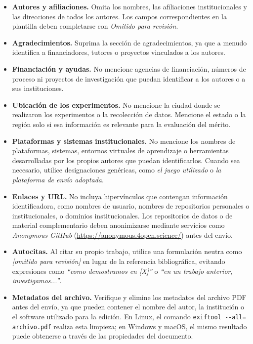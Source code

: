 \documentclass[spanish]{rbie2026}%
\begin{document}
\begin{itemize}
    \item \textbf{Autores y afiliaciones.} Omita los nombres, las afiliaciones institucionales y las direcciones de todos los autores. Los campos correspondientes en la plantilla deben completarse con \textit{Omitido para revisión}.

    \item \textbf{Agradecimientos.} Suprima la sección de agradecimientos, ya que a menudo identifica a financiadores, tutores o proyectos vinculados a los autores.

    \item \textbf{Financiación y ayudas.} No mencione agencias de financiación, números de proceso ni proyectos de investigación que puedan identificar a los autores o a sus instituciones.

    \item \textbf{Ubicación de los experimentos.} No mencione la ciudad donde se realizaron los experimentos o la recolección de datos. Mencione el estado o la región solo si esa información es relevante para la evaluación del mérito.

    \item \textbf{Plataformas y sistemas institucionales.} No mencione los nombres de plataformas, sistemas, entornos virtuales de aprendizaje o herramientas desarrolladas por los propios autores que puedan identificarlos. Cuando sea necesario, utilice designaciones genéricas, como \textit{el juego utilizado} o \textit{la plataforma de envío adoptada}.

    \item \textbf{Enlaces y URL.} No incluya hipervínculos que contengan información identificadora, como nombres de usuario, nombres de repositorios personales o institucionales, o dominios institucionales. Los repositorios de datos o de material complementario deben anonimizarse mediante servicios como \textit{Anonymous GitHub} (\url{https://anonymous.4open.science/}) antes del envío.

    \item \textbf{Autocitas.} Al citar su propio trabajo, utilice una formulación neutra como \textit{[omitido para revisión]} en lugar de la referencia bibliográfica, evitando expresiones como \textit{``como demostramos en [X]''} o \textit{``en un trabajo anterior, investigamos...''}.

    \item \textbf{Metadatos del archivo.} Verifique y elimine los metadatos del archivo PDF antes del envío, ya que pueden contener el nombre del autor, la institución o el software utilizado para la edición. En Linux, el comando \texttt{exiftool -{}-all= archivo.pdf} realiza esta limpieza; en Windows y macOS, el mismo resultado puede obtenerse a través de las propiedades del documento.


\end{itemize}
\end{document}
